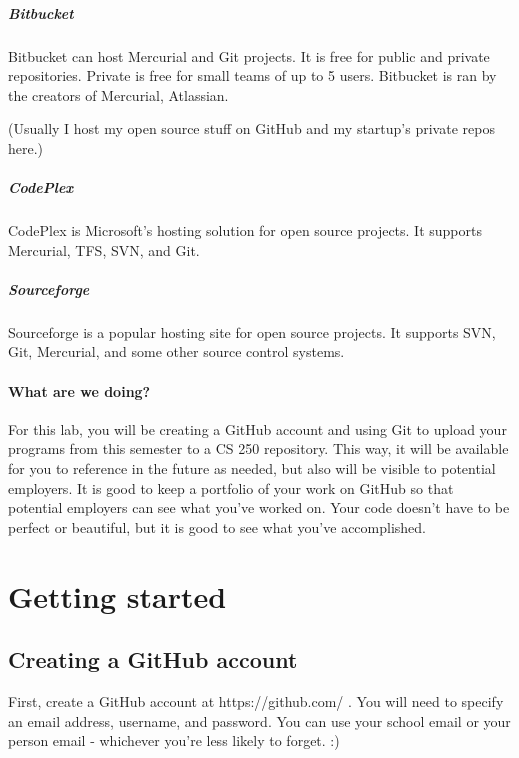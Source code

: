 \documentclass[a4paper,12pt,oneside]{book}
\begin{document}
        \subparagraph{Bitbucket}

            Bitbucket can host Mercurial and Git projects. It is free
            for public and private repositories. Private is free for
            small teams of up to 5 users. Bitbucket is ran by the
            creators of Mercurial, Atlassian.

            (Usually I host my open source stuff on GitHub and my
            startup's private repos here.)

        \subparagraph{CodePlex}

            CodePlex is Microsoft's hosting solution for open source projects.
            It supports Mercurial, TFS, SVN, and Git.

        \subparagraph{Sourceforge}

            Sourceforge is a popular hosting site for open source projects.
            It supports SVN, Git, Mercurial, and some other source control systems.

    \hrulefill

    \paragraph{What are we doing?}

        For this lab, you will be creating a GitHub account and using Git
        to upload your programs from this semester to a CS 250 repository.
        This way, it will be available for you to reference in the future
        as needed, but also will be visible to potential employers.
        It is good to keep a portfolio of your work on GitHub so that
        potential employers can see what you've worked on. Your code doesn't
        have to be perfect or beautiful, but it is good to see what you've
        accomplished.

    \hrulefill

    \section{Getting started}

        \subsection{Creating a GitHub account}

            First, create a GitHub account at https://github.com/ .
            You will need to specify an email address, username, and password.
            You can use your school email or your person email - whichever
            you're less likely to forget. :)
\end{document}
